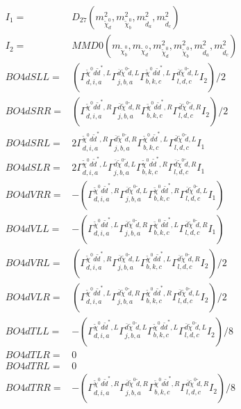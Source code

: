 \documentclass[A4,landscape]{article}
\begin{document}
\begin{align} 
I_1 = & D_{27}(m^2_{\tilde{\chi}^0_{{d}}}, m^2_{\tilde{\chi}^0_{{b}}}, m^2_{\tilde{d}_{{a}}}, m^2_{\tilde{d}_{{c}}}) \\ 
I_2 = & MMD0(m_{\tilde{\chi}^0_{{b}}}, m_{\tilde{\chi}^0_{{d}}}, m^2_{\tilde{\chi}^0_{{d}}}, m^2_{\tilde{\chi}^0_{{b}}}, m^2_{\tilde{d}_{{a}}}, m^2_{\tilde{d}_{{c}}}) \\ 
  BO4dSLL= & ( \Gamma^{\tilde{\chi}^0 d \tilde{d}^*,L}_{d, i, a} \Gamma^{\bar{d}\tilde{\chi}^0 \tilde{d} ,L}_{j, b, a} \Gamma^{\tilde{\chi}^0 d \tilde{d}^*,L}_{b, k, c} \Gamma^{\bar{d}\tilde{\chi}^0 \tilde{d} ,L}_{l, d, c} I_2)/2 \\ 
  BO4dSRR= & ( \Gamma^{\tilde{\chi}^0 d \tilde{d}^*,R}_{d, i, a} \Gamma^{\bar{d}\tilde{\chi}^0 \tilde{d} ,R}_{j, b, a} \Gamma^{\tilde{\chi}^0 d \tilde{d}^*,R}_{b, k, c} \Gamma^{\bar{d}\tilde{\chi}^0 \tilde{d} ,R}_{l, d, c} I_2)/2 \\ 
  BO4dSRL= & 2  \Gamma^{\tilde{\chi}^0 d \tilde{d}^*,R}_{d, i, a} \Gamma^{\bar{d}\tilde{\chi}^0 \tilde{d} ,R}_{j, b, a} \Gamma^{\tilde{\chi}^0 d \tilde{d}^*,L}_{b, k, c} \Gamma^{\bar{d}\tilde{\chi}^0 \tilde{d} ,L}_{l, d, c} I_1 \\ 
  BO4dSLR= & 2  \Gamma^{\tilde{\chi}^0 d \tilde{d}^*,L}_{d, i, a} \Gamma^{\bar{d}\tilde{\chi}^0 \tilde{d} ,L}_{j, b, a} \Gamma^{\tilde{\chi}^0 d \tilde{d}^*,R}_{b, k, c} \Gamma^{\bar{d}\tilde{\chi}^0 \tilde{d} ,R}_{l, d, c} I_1 \\ 
  BO4dVRR= & -( \Gamma^{\tilde{\chi}^0 d \tilde{d}^*,R}_{d, i, a} \Gamma^{\bar{d}\tilde{\chi}^0 \tilde{d} ,L}_{j, b, a} \Gamma^{\tilde{\chi}^0 d \tilde{d}^*,R}_{b, k, c} \Gamma^{\bar{d}\tilde{\chi}^0 \tilde{d} ,L}_{l, d, c} I_1) \\ 
  BO4dVLL= & -( \Gamma^{\tilde{\chi}^0 d \tilde{d}^*,L}_{d, i, a} \Gamma^{\bar{d}\tilde{\chi}^0 \tilde{d} ,R}_{j, b, a} \Gamma^{\tilde{\chi}^0 d \tilde{d}^*,L}_{b, k, c} \Gamma^{\bar{d}\tilde{\chi}^0 \tilde{d} ,R}_{l, d, c} I_1) \\ 
  BO4dVRL= & ( \Gamma^{\tilde{\chi}^0 d \tilde{d}^*,R}_{d, i, a} \Gamma^{\bar{d}\tilde{\chi}^0 \tilde{d} ,L}_{j, b, a} \Gamma^{\tilde{\chi}^0 d \tilde{d}^*,L}_{b, k, c} \Gamma^{\bar{d}\tilde{\chi}^0 \tilde{d} ,R}_{l, d, c} I_2)/2 \\ 
  BO4dVLR= & ( \Gamma^{\tilde{\chi}^0 d \tilde{d}^*,L}_{d, i, a} \Gamma^{\bar{d}\tilde{\chi}^0 \tilde{d} ,R}_{j, b, a} \Gamma^{\tilde{\chi}^0 d \tilde{d}^*,R}_{b, k, c} \Gamma^{\bar{d}\tilde{\chi}^0 \tilde{d} ,L}_{l, d, c} I_2)/2 \\ 
  BO4dTLL= & -( \Gamma^{\tilde{\chi}^0 d \tilde{d}^*,L}_{d, i, a} \Gamma^{\bar{d}\tilde{\chi}^0 \tilde{d} ,L}_{j, b, a} \Gamma^{\tilde{\chi}^0 d \tilde{d}^*,L}_{b, k, c} \Gamma^{\bar{d}\tilde{\chi}^0 \tilde{d} ,L}_{l, d, c} I_2)/8 \\ 
  BO4dTLR= & 0 \\ 
  BO4dTRL= & 0 \\ 
  BO4dTRR= & -( \Gamma^{\tilde{\chi}^0 d \tilde{d}^*,R}_{d, i, a} \Gamma^{\bar{d}\tilde{\chi}^0 \tilde{d} ,R}_{j, b, a} \Gamma^{\tilde{\chi}^0 d \tilde{d}^*,R}_{b, k, c} \Gamma^{\bar{d}\tilde{\chi}^0 \tilde{d} ,R}_{l, d, c} I_2)/8 \\ 
\end{align} 
\end{document}
